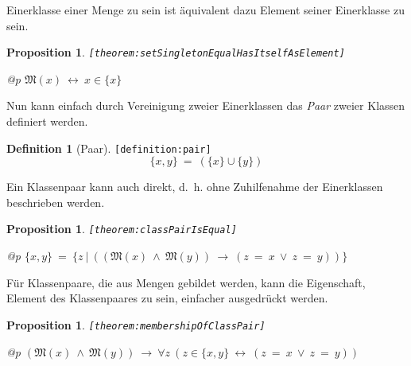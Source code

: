 \documentclass[a4paper,german,10pt,twoside]{book}
\newtheorem{prop}[thm]{Proposition}
\theoremstyle{definition}
\newtheorem{defn}{Definition}
\theoremstyle{remark}
\begin{document}
\par
Einerklasse einer Menge zu sein ist {\"a}quivalent dazu Element seiner
Einerklasse zu sein.

\begin{prop}
\label{theorem:setSingletonEqualHasItselfAsElement} \hypertarget{theorem:setSingletonEqualHasItselfAsElement}{}
{\tt \tiny [\verb]theorem:setSingletonEqualHasItselfAsElement]]}
\mbox{}
\begin{longtable}{{@{\extracolsep{\fill}}p{\linewidth}}}
\centering $\mathfrak{M}(x)\ \leftrightarrow\ x \in \{ x \}$
\end{longtable}

\end{prop}


\par
Nun kann einfach durch Vereinigung zweier Einerklassen das \emph{Paar}
zweier Klassen definiert werden.

\begin{defn}[Paar]
\label{definition:pair} \hypertarget{definition:pair}{}
{\tt \tiny [\verb]definition:pair]]}
$$\{ x, y \} \ = \ (\{ x \} \cup \{ y \})$$
\end{defn}


\par
Ein Klassenpaar kann auch direkt, d.~h. ohne Zuhilfenahme der Einerklassen
beschrieben werden.

\begin{prop}
\label{theorem:classPairIsEqual} \hypertarget{theorem:classPairIsEqual}{}
{\tt \tiny [\verb]theorem:classPairIsEqual]]}
\mbox{}
\begin{longtable}{{@{\extracolsep{\fill}}p{\linewidth}}}
\centering $\{ x, y \} \ = \ \{ z \ | \ ((\mathfrak{M}(x)\ \land\ \mathfrak{M}(y))\ \rightarrow\ (z \ = \ x\ \lor\ z \ = \ y)) \} $
\end{longtable}

\end{prop}


\par
F{\"u}r Klassenpaare, die aus Mengen gebildet werden, kann die Eigenschaft, Element des Klassenpaares zu sein, einfacher ausgedr{\"u}ckt werden.

\begin{prop}
\label{theorem:membershipOfClassPair} \hypertarget{theorem:membershipOfClassPair}{}
{\tt \tiny [\verb]theorem:membershipOfClassPair]]}
\mbox{}
\begin{longtable}{{@{\extracolsep{\fill}}p{\linewidth}}}
\centering $(\mathfrak{M}(x)\ \land\ \mathfrak{M}(y))\ \rightarrow\ \forall z\ (z \in \{ x, y \}\ \leftrightarrow\ (z \ = \ x\ \lor\ z \ = \ y))$
\end{longtable}

\end{prop}
\end{document}
